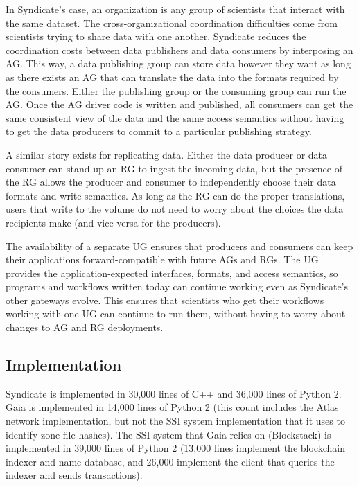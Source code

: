 In Syndicate's case, an organization is any group of scientists
that interact with the same dataset.  The cross-organizational coordination
difficulties come from scientists trying to share data with one another.
Syndicate reduces the coordination costs between data publishers and data consumers by
interposing an AG.  This way, a data publishing group can store data however
they want as long as there exists an AG that can translate the data into the
formats required by the consumers.  Either the publishing group or the consuming
group can run the AG.  Once the AG driver code is written and published,
all consumers can get the same consistent view of the data and the same access
semantics without having to get the data producers to commit to a particular
publishing strategy.

A similar story exists for replicating data.  Either the data producer or data
consumer can stand up an RG to ingest the incoming data, but the presence of the
RG allows the producer and consumer to independently choose their data formats
and write semantics.  As long as the RG can do the proper translations, users
that write to the volume do not need to worry about the choices the data
recipients make (and vice versa for the producers).

The availability of a separate UG ensures that producers and consumers can keep
their applications forward-compatible with future AGs and RGs.  The UG provides
the application-expected interfaces, formats, and access semantics, so
programs and workflows written today can continue working even as Syndicate's
other gateways evolve.  This ensures that scientists who get their workflows
working with one UG can continue to run them, without having to worry about
changes to AG and RG deployments.

\subsection{Implementation}

Syndicate is implemented in 30,000 lines of C++ and 36,000 lines of Python 2.
Gaia is implemented in 14,000 lines of Python 2 (this count includes the Atlas
network implementation, but not the SSI system implementation that it uses to
identify zone file hashes).  The SSI system that Gaia relies on (Blockstack) is
implemented in 39,000 lines of Python 2 (13,000 lines implement the
blockchain indexer and name database, and 26,000 implement the client that
queries the indexer and sends transactions).


